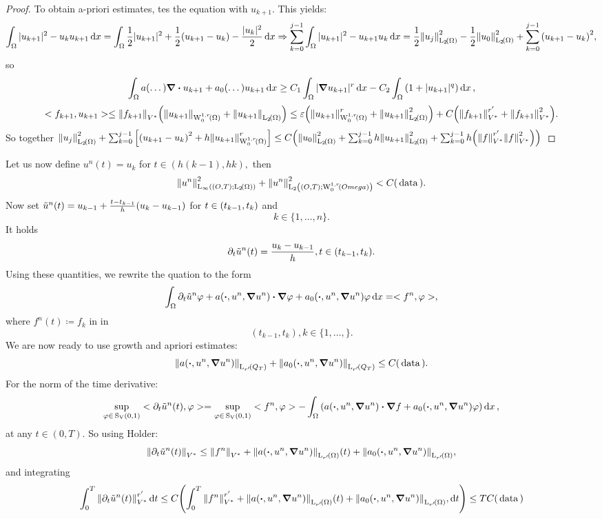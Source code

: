 \documentclass{article}
\begin{document}
\begin{proof}
	To obtain a-priori estimates, tes the equation with $u_{k+1}$. This yields:
	\[
		\int_{\Omega}|u_{k+1}|^{2} - u_k u_{k+1}\dd{x} = \int_{\Omega}\frac{1}{2}|u_{k+1}|^{2} + \frac{1}{2}\qty(u_{k+1}- u_k) - \frac{|u_k|^{2}}{2}\dd{x} \Rightarrow \sum_{k=0}^{j-1}\int_{\Omega}|u_{k+1}|^{2} - u_{k+1}u_k\dd{x}  = \frac{1}{2} \norm{u_j}_{\LpSet[2]{\Omega}}^{2} - \frac{1}{2}\norm{u_0}_{\LpSet[2]{\Omega}}^{2} + \sum_{k=0}^{j-1}\qty(u_{k+1}-u_k)^{2},
	\]
	so
	\[
		\int_{\Omega}a\qty(\dots) \grad \vdot u_{k+1} + a_0\qty(\dots) u_{k+1} \dd{x} \geq C_1 \int_{\Omega}|\grad u_{k+1}|^r\dd{x} - C_2 \int_{\Omega}\qty(1+|u_{k+1}|^q)\dd{x},
	\]
	\[
		<f_{k+1}, u_{k+1}> \leq \norm{f_{k+1}}_{V^{*}}\qty(\norm{u_{k+1}}_{\WkpzeroSet[1][r]{\Omega}}+ \norm{u_{k+1}}_{\LpSet[2]{\Omega}}) \leq \varepsilon \qty(\norm{u_{k+1}}_{\WkpzeroSet[1][r]{\Omega}}^r + \norm{u_{k+1}}_{\LpSet[2]{\Omega}}^{2}) + C\qty(\norm{f_{k+1}}^{r'}_{V^{*}}+\norm{f_{k+1}}^{2}_{V^{*}}).
	\]
	So together $\norm{u_j}_{\LpSet[2]{\Omega}}^{2} + \sum_{k=0}^{j-1}\qty[\qty(u_{k+1}-u_k)^{2} + h \norm{u_{k+1}}_{\WkpzeroSet[1][r]{\Omega}}^r] \leq C\qty(\norm{u_0}_{\LpSet[2]{\Omega}}^{2}+ \sum_{k=0}^{j-1}h \norm{u_{k+1}}_{\LpSet[2]{\Omega}}^{2} + \sum_{k=0}^{j-1}h \qty(\norm{f}_{V^{*}}^{r'}\norm{f}_{V^{*}}^{2}))$
\end{proof}
Let us now define $u^n(t) = u_k$ for $t \in (h(k-1),hk),$ then
\[
	\NormLinfIntX{u^n}{O}{T}{\LpSet[2]{\Omega}}^{2} + \NormLpIntX{u^n}{2}{O}{T}{\WkpzeroSet[1][r]{Omega}}^{2} < C(\, \text{data} \,).
\]
Now set $\tilde{u}^n(t) = u_{k-1}+ \frac{t-t_{k-1}}{h}\qty(u_k-u_{k-1})$ for $t \in \qty(t_{k-1},t_k)$ and
\[
	k \in \{1, \dots, n\}.
\]
It holds
\[
	\partial_t \tilde{u}^n(t) = \frac{u_k-u_{k-1}}{h}, t \in \qty(t_{k-1},t_k).
\]
Using these quantities, we rewrite the quation to the form
\[
	\int_{\Omega}\partial_t \tilde{u}^n \varphi + a\qty(\vdot, u^n, \grad u^n)\vdot \grad \varphi + a_0\qty(\vdot, u^n, \grad u^n) \varphi\dd{x} = <f^n, \varphi>,
\]
where $f^n(t) \coloneq f_k$ in in
\[
	(t_{k-1}, t_k), k \in \{1,\dots,\}.
\]
We are now ready to use growth and apriori estimates:
\[
	\norm{a\qty(\vdot, u^n, \grad u^n)}_{\LpSet[r']{Q_T}} + \norm{a_0\qty(\vdot, u^n, \grad u^n)}_{\LpSet[r']{Q_T}} \leq C(\, \text{data} \,).
\]
For the norm of the time derivative:
\[
	\sup_{\varphi \in \, \text{S}_\text{V}(0,1)} <\partial_t \tilde{u}^n(t), \varphi> =  \sup_{\varphi \in \, \text{S}_\text{V}(0,1)} <f^n, \varphi> - \int_{\Omega}\qty(a\qty(\vdot, u^n, \grad u^n)\vdot \grad f + a_0\qty(\vdot, u^n, \grad u^n)\varphi)\dd{x},
\]
at any $t \in (0,T)$. So using Holder:
\[
	\norm{\partial_t \tilde{u}^n(t)}_{V^{*}} \leq \norm{f^n}_{V^{*}} + \norm{a\qty(\vdot, u^n, \grad u^n)}_{\LpSet[r']{\Omega}}(t) + \norm{a_0\qty(\vdot, u^n, \grad u^n)}_{\LpSet[r']{\Omega}},
\]
and integrating
\[
	\int_0^T \norm{\partial_t \tilde{u}^n(t)}_{V^{*}}^{r'} \dd{t} \leq C\qty(\int_0^T \norm{f^n}_{V^{*}}^{r'}+ \norm{a\qty(\vdot, u^n, \grad u^n)}_{\LpSet[r']{\Omega}}(t) + \norm{a_0\qty(\vdot, u^n, \grad u^n)}_{\LpSet[r']{\Omega}},
	\dd{t}) \leq T C\qty(\, \text{data} \,)
\]
\end{document}
